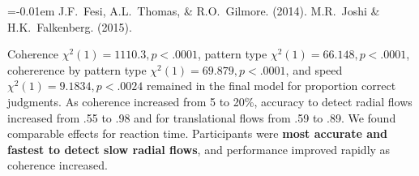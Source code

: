 \documentclass[landscape,final,a0paper,fontscale=0.285]{baposter}
\begin{document}
\begin{poster}
    {
      \smaller
      
      \renewcommand{\section}[2]{\vskip 0.05em}
        \begin{thebibliography}{1}\itemsep=-0.01em
        \setlength{\baselineskip}{0.4em}
          J.F.~Fesi, A.L.~Thomas, \& R.O.~Gilmore. (2014).
          M.R.~Joshi \& H.K.~Falkenberg. (2015).
        \end{thebibliography}
     \vspace{0.3em}
    }

    {
      Coherence \(\chi^{2}(1)=1110.3, p<.0001\), pattern type \(\chi^{2}(1)=66.148, p<.0001\), cohererence by pattern type \(\chi^{2}(1)=69.879, p<.0001\), and speed \(\chi^{2}(1)=9.1834, p<.0024\) remained in the final model for proportion correct judgments. 
      As coherence increased from 5 to 20\%, accuracy to detect radial flows increased from .55 to .98 and for translational flows from .59 to .89. 
      We found comparable effects for reaction time.
      Participants were \textbf{most accurate and fastest to detect slow radial flows}, and performance improved  rapidly as coherence increased.

}
\end{poster}
\end{document}
